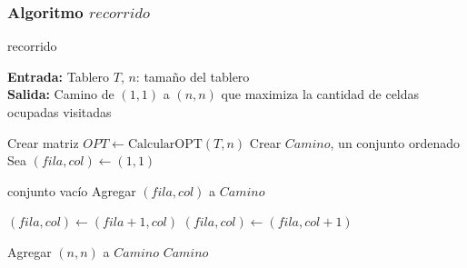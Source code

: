 \subsubsection{Algoritmo $recorrido$}

\begin{algorithm}
	\caption{recorrido}
	\label{alg:recorrido}
	\textbf{Entrada:} Tablero $T$, $n$: tamaño del tablero \\
	\textbf{Salida:} Camino de $(1,1)$ a $(n,n)$ que maximiza la cantidad de celdas ocupadas visitadas
	\begin{algorithmic}[1]
		\State Crear matriz $OPT \gets \text{CalcularOPT}(T, n)$
		\State Crear $Camino$, un conjunto ordenado
		\State Sea $(fila, col) \gets (1, 1)$

		\State \Return conjunto vacío 
		\EndIf
		\State Agregar $(fila, col)$ a $Camino$

		\State $(fila, col) \gets (fila+1, col)$
		\Else
		\State $(fila, col) \gets (fila, col+1)$
		\EndIf
		\EndWhile

		\State Agregar $(n, n)$ a $Camino$
		\State \Return $Camino$
	\end{algorithmic}
\end{algorithm}
